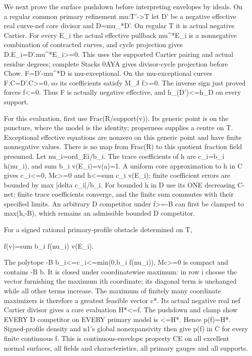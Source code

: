 \documentclass[11pt]{article}
\begin{document}
We next prove the surface pushdown before interpreting envelopes by ideals. On a regular common primary refinement mu:T'->T let D' be a negative effective real curve-nef core divisor and D=mu\_*D'. On regular T it is actual negative Cartier. For every E\_i the actual effective pullback mu\textasciicircum{}*E\_i is a nonnegative combination of contracted curves, and cycle projection gives D.E\_i=D'.mu\textasciicircum{}*E\_i>=0. This uses the supported Cartier pairing and actual residue degrees; complete Stacks 0AYA gives divisor-cycle projection before Chow. F=D'-mu\textasciicircum{}*D is mu-exceptional. On the mu-exceptional curves F.C=D'.C>=0, so its coefficients satisfy M\_J f>=0. The inverse sign just proved forces f<=0. Thus F is actually negative effective, and h\_(D')<=h\_D on every support.

For this evaluation, first use Frac(R/support(v)). Its generic point is on the puncture, where the model is the identity; properness supplies a centre on T. Exceptional effective equations are nonzero on this generic point and have finite nonnegative values. There is no map from Frac(R) to this quotient fraction field presumed. Let nu\_i=ord\_Ei/b\_i. The trace coefficients of h are c\_i=b\_i h(nu\_i), and sum b\_i v(E\_i)=v(a)=1. A uniform core approximation to h in C gives c\_i<=0, Mc>=0 and h<=sum c\_i v(E\_i); finite coefficient errors are bounded by max |delta c\_i|/b\_i. For bounded h in D use its ONE decreasing C-net; finite trace coefficients converge, and the finite sum commutes with their specified limits. An arbitrary D competitor under f>=-B can first be clamped to max(h,-B), which remains an admissible bounded D competitor.

For a signed rational primary-profile obstacle determined on T,

f(v)=sum b\_i f(nu\_i) v(E\_i).

The polytope -B b\_i<=c\_i<=min(0,b\_i f(nu\_i)), Mc>=0 is compact and contains -B b. It is closed under coordinatewise maximum: in row i choose the vector furnishing the maximum ith coordinate; its diagonal term is unchanged while all other terms increase. The maximum of finitely many coordinate maximizers is therefore a greatest feasible vector c*. Its actual negative real nef Cartier divisor gives a core evaluation H*<=f. The pushdown and clamp show EVERY D competitor on EVERY primary model is <=H*. Hence p(f)=H*. Signed-profile density and n1's global nonexpansivity then give p(f) in C for every finite continuous f. This is continuous-envelope property CE on all excellent normal surfaces, all fields and characteristics, all primary gauges and all supports.
\end{document}

